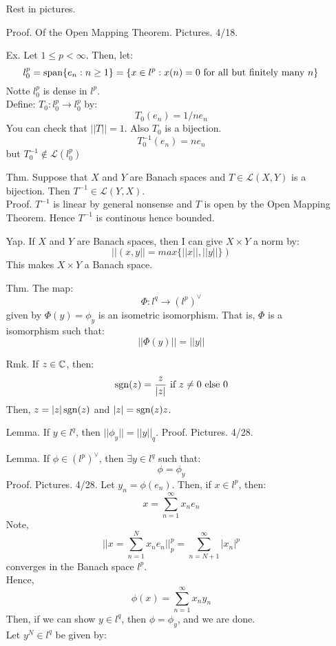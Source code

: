 \documentclass[12pt]{article}
\begin{document}
\begin{itemize}
    Rest in pictures.
    \item[Proof.] Of the Open Mapping Theorem. Pictures. 4/18.
    \item[Ex.] Let $1 \leq p < \infty$. Then, let: 
    \[ l_0^p = \operatorname{span}\{e_n : n \geq 1\} = \{x \in l^p: x(n) = 0 \text{ for all but finitely many $n$}\}\]
    Notte $l_0^p$ is dense in $l^p$. \\
    Define: $T_0: l_0^p \to l_0^p$ by:
    \[T_0(e_n) = 1/n e_n\]
    You can check that $||T|| = 1$. Also $T_0$ is a bijection. 
    \[T_0^{-1}(e_n) = ne_n\]
    but $T_0^{-1} \not\in \mathcal{L}(l_0^p)$
    \item[Thm.] Suppose that $X$ and $Y$ are Banach spaces and $T \in \mathcal{L}(X,Y)$ is a bijection. Then $T^{-1} \in \mathcal{L}(Y,X)$. \\
    Proof. $T^{-1}$ is linear by general nonsense and $T$ is open by the Open Mapping Theorem. Hence $T^{-1}$ is continous hence bounded.
    \item[Yap.] If $X$ and $Y$ are Banach spaces, then I can give $X \times Y$ a norm by: 
    \[ ||(x,y|| = max\{||x||, ||y||\})\]
    This makes $X \times Y$ a Banach space.
    \newpage
    \item[Thm.] The map:
    \[ \Phi: l^q \to (l^p)^\vee \]
    given by $\Phi(y) = \phi_y$ is an isometric isomorphism. That is, $\Phi$ is a isomorphism such that:
    \[ ||\Phi(y)|| = ||y|| \]
    \item[Rmk.] If $z \in \mathbb C$, then: 
    \[ \operatorname{sgn}(z) = \frac{z}{|z|} \text{ if } z \neq 0 \text{ else } 0 \]
    Then, $z = |z| \operatorname{sgn}(z)$ and $|z| = \operatorname{sgn}(z) z$.
    \item[Lemma.] If $y \in l^q$, then $||\phi_y|| = ||y||_q$.   
    Proof. Pictures. 4/28.
    \item[Lemma.] If $\phi \in (l^p)^\vee$, then $\exists y \in l^q$ such that:
    \[ \phi = \phi_y\]
    Proof. Pictures. 4/28.
    Let $y_n = \phi(e_n)$. Then, if $x \in l^p$, then: 
    \[ x = \sum_{n=1}^\infty x_ne_n\]
    Note, 
    \[ || x = \sum_{n=1}^N x_n e_n||_p^p = \sum_{n=N+1}^\infty |x_n|^p \]
    converges in the Banach space $l^p$. \\
    Hence, 
    \[ \phi(x) = \sum_{n=1}^\infty x_ny_n \]
    Then, if we can show $y \in l^q$, then $\phi = \phi_y$, and we are done. \\
    Let $y^N \in l^q$ be given by:

\end{itemize}
\end{document}
